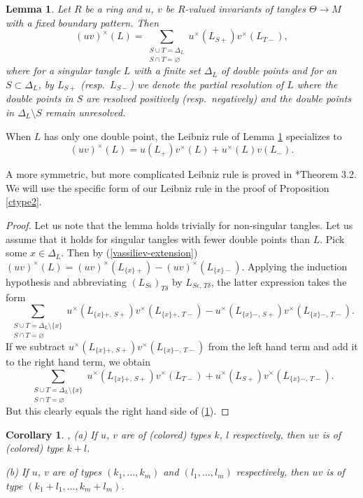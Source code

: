 \documentclass[a4paper,12pt,reqno,oneside]{amsart} %
\theoremstyle{plain}
\newtheorem{lemma}[theorem]{Lemma}
\newtheorem{corollary}[theorem]{Corollary}
\theoremstyle{definition}
\theoremstyle{named}
\def\x{\times}
\def\but{\setminus}
\def\emptyset{\varnothing}
\renewcommand{\:}{\colon}
\begin{document}
\begin{lemma} \label{leibniz}
Let $R$ be a ring and $u$, $v$ be $R$-valued invariants of tangles $\Theta\to M$ with a fixed boundary pattern.
Then
\[(uv)^\x(L)=\sum_{\substack{S\cup T=\Delta_L\\ S\cap T=\emptyset}} u^\x(L_{S+})v^\x(L_{T-}),\] 
where for a singular tangle $L$ with a finite set $\Delta_L$ of double points and for an $S\subset\Delta_L$, by $L_{S+}$ 
(resp.\ $L_{S-}$) we denote the partial resolution of $L$ where the double points in $S$ are resolved positively (resp.\ negatively)
and the double points in $\Delta_L\but S$ remain unresolved.
\end{lemma}

When $L$ has only one double point, the Leibniz rule of Lemma \ref{leibniz} specializes to
\[(uv)^\x(L)=u(L_+)v^\x(L)+u^\x(L)v(L_-).\]

A more symmetric, but more complicated Leibniz rule is proved in \cite{Wi}*{Theorem 3.2}.
We will use the specific form of our Leibniz rule in the proof of Proposition \ref{ctype2}.

\begin{proof} Let us note that the lemma holds trivially for non-singular tangles.
Let us assume that it holds for singular tangles with fewer double points than $L$.
Pick some $x\in\Delta_L$.
Then by (\ref{vassiliev-extension}) $(uv)^\x(L)=(uv)^\x(L_{\{x\}+})-(uv)^\x(L_{\{x\}-})$.
Applying the induction hypothesis and abbreviating $(L_{S\epsilon})_{T\delta}$ by $L_{S\epsilon,\,T\delta}$, the latter expression
takes the form
\[\sum_{\substack{S\cup T=\Delta_L\but\{x\}\\ S\cap T=\emptyset}} u^\x(L_{\{x\}+,\,S+})v^\x(L_{\{x\}+,\,T-})-u^\x(L_{\{x\}-,\,S+})v^\x(L_{\{x\}-,\,T-}).\]
If we subtract $u^\x(L_{\{x\}+,\,S+})v^\x(L_{\{x\}-,\,T-})$ from the left hand term and add it to the right hand term, we obtain
\[\sum_{\substack{S\cup T=\Delta_L\but\{x\}\\ S\cap T=\emptyset}} u^\x(L_{\{x\}+,\,S+})v^\x(L_{T-})+u^\x(L_{S+})v^\x(L_{\{x\}-,\,T-}).\]
But this clearly equals the right hand side of (\ref{leibniz}).
\end{proof}

\begin{corollary} \cite{Gu1}, \cite{Wi} \label{product}
(a) If $u$, $v$ are of (colored) types $k$, $l$ respectively, then $uv$ is of (colored) type $k+l$.

(b) If $u$, $v$ are of types $(k_1,\dots,k_m)$ and $(l_1,\dots,l_m)$ respectively, then $uv$ is of type $(k_1+l_1,\dots,k_m+l_m)$.
\end{corollary}
\end{document}

